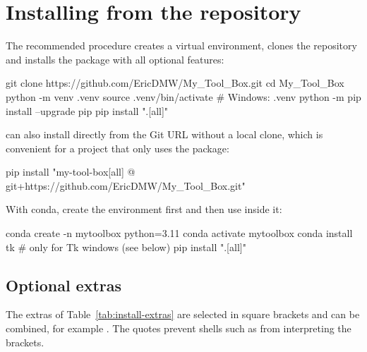 \section{Installing from the repository}\label{sec:install-pip}

The recommended procedure creates a virtual environment, clones the
repository and installs the package with all optional features:

\begin{shellcode}
git clone https://github.com/EricDMW/My_Tool_Box.git
cd My_Tool_Box
python -m venv .venv
source .venv/bin/activate          # Windows: .venv\Scripts\activate
python -m pip install --upgrade pip
pip install ".[all]"
\end{shellcode}

 can also install directly from the Git URL without a local clone,
which is convenient for a project that only uses the package:

\begin{shellcode}
pip install "my-tool-box[all] @ git+https://github.com/EricDMW/My_Tool_Box.git"
\end{shellcode}

With conda, create the environment first and then use  inside it:

\begin{shellcode}
conda create -n mytoolbox python=3.11
conda activate mytoolbox
conda install tk                   # only for Tk windows (see below)
pip install ".[all]"
\end{shellcode}

\subsection{Optional extras}\label{sec:install-extras}

The extras of Table~\ref{tab:install-extras} are selected in square brackets
and can be combined, for example . The
quotes prevent shells such as  from interpreting the brackets.


